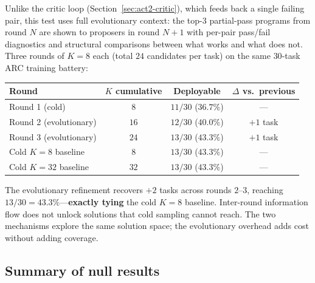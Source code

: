 \documentclass[11pt]{amsart}
\newcommand\1{{\mathds{1}}}
\theoremstyle{definition}
\theoremstyle{remark}
\numberwithin{equation}{section}
\begin{document}
Unlike the critic loop (Section~\ref{sec:act2-critic}), which feeds back a single failing pair, this test uses full evolutionary context: the top-$3$ partial-pass programs from round $N$ are shown to proposers in round $N{+}1$ with per-pair pass/fail diagnostics and structural comparisons between what works and what does not.
Three rounds of $K\!=\!8$ each (total $24$ candidates per task) on the same $30$-task ARC training battery:

\begin{center}\small
\begin{tabular}{lccc}
\toprule
Round & $K$ cumulative & Deployable & $\Delta$ vs.\ previous \\
\midrule
Round 1 (cold) & $8$ & $11/30$ ($36.7\%$) & --- \\
Round 2 (evolutionary) & $16$ & $12/30$ ($40.0\%$) & $+1$ task \\
Round 3 (evolutionary) & $24$ & $13/30$ ($43.3\%$) & $+1$ task \\
\midrule
Cold $K\!=\!8$ baseline & $8$ & $13/30$ ($43.3\%$) & --- \\
Cold $K\!=\!32$ baseline & $32$ & $13/30$ ($43.3\%$) & --- \\
\bottomrule
\end{tabular}
\end{center}

The evolutionary refinement recovers $+2$ tasks across rounds $2$--$3$, reaching $13/30 = 43.3\%$---\textbf{exactly tying} the cold $K\!=\!8$ baseline.
Inter-round information flow does not unlock solutions that cold sampling cannot reach.
The two mechanisms explore the same solution space; the evolutionary overhead adds cost without adding coverage.

\subsection{Summary of null results}\label{sec:act2-six-nulls}
\end{document}

